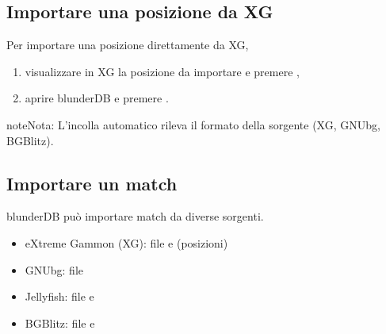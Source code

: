 \documentclass[letterpaper,10pt,italian]{sphinxmanual}
\begin{document}
\subsection{Importare una posizione da XG}
\label{\detokenize{guide_utilisateur:import-une-position-depuis-xg}}
\sphinxAtStartPar
Per importare una posizione direttamente da XG,
\begin{enumerate}
%
\item {} 
\sphinxAtStartPar
visualizzare in XG la posizione da importare e premere ,

\item {} 
\sphinxAtStartPar
aprire blunderDB e premere .

\end{enumerate}

\begin{sphinxadmonition}{note}{Nota:}
\sphinxAtStartPar
L’incolla automatico rileva il formato della sorgente (XG, GNUbg, BGBlitz).
\end{sphinxadmonition}


\subsection{Importare un match}
\label{\detokenize{guide_utilisateur:importer-un-match}}
\sphinxAtStartPar
blunderDB può importare match da diverse sorgenti.

\sphinxAtStartPar
{}
\begin{itemize}
\item {} 
\sphinxAtStartPar
eXtreme Gammon (XG): file  e  (posizioni)

\item {} 
\sphinxAtStartPar
GNUbg: file 

\item {} 
\sphinxAtStartPar
Jellyfish: file  e 

\item {} 
\sphinxAtStartPar
BGBlitz: file  e 

\end{itemize}
\end{document}
